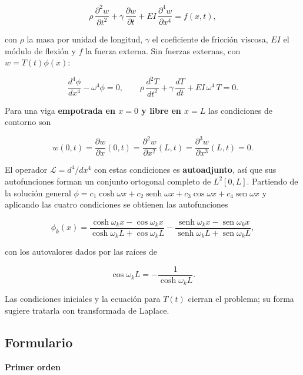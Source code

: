 \documentclass[
  spanish,
  a4paper,
]{scrbook}
\theoremstyle{definition}
\theoremstyle{plain}
\theoremstyle{definition}
\theoremstyle{plain}
\theoremstyle{definition}
\theoremstyle{remark}
\begin{document}
\[
\rho\,\frac{\partial^2 w}{\partial t^2} + \gamma\,\frac{\partial w}{\partial t}
+ EI\,\frac{\partial^4 w}{\partial x^4} = f(x,t) ,
\]

con \(\rho\) la masa por unidad de longitud, \(\gamma\) el coeficiente
de fricción viscosa, \(EI\) el módulo de flexión y \(f\) la fuerza
externa. Sin fuerzas externas, con \(w = T(t)\phi(x)\):

\[
\frac{d^4\phi}{dx^4} - \omega^4\phi = 0, \qquad
\rho\,\frac{d^2T}{dt^2} + \gamma\,\frac{dT}{dt} + EI\,\omega^4\,T = 0 .
\]

Para una viga \textbf{empotrada en \(x=0\) y libre en \(x=L\)} las
condiciones de contorno son

\[
w(0,t) = \frac{\partial w}{\partial x}(0,t) = \frac{\partial^2 w}{\partial x^2}(L,t)
= \frac{\partial^3 w}{\partial x^3}(L,t) = 0 .
\]

El operador \(\mathcal{L} = d^4/dx^4\) con estas condiciones es
\textbf{autoadjunto}, así que sus autofunciones forman un conjunto
ortogonal completo de \(L^2[0,L]\). Partiendo de la solución general
\(\phi = c_1\cosh\omega x + c_2\operatorname{senh}\omega x + c_3\cos\omega x + c_4\operatorname{sen}\omega x\)
y aplicando las cuatro condiciones se obtienen las autofunciones

\[
\phi_k(x) = \frac{\cosh\omega_kx - \cos\omega_kx}{\cosh\omega_kL + \cos\omega_kL}
- \frac{\operatorname{senh}\omega_kx - \operatorname{sen}\omega_kx}{\operatorname{senh}\omega_kL + \operatorname{sen}\omega_kL} ,
\]

con los autovalores dados por las raíces de

\[
\cos\omega_kL = -\frac{1}{\cosh\omega_kL} .
\]

Las condiciones iniciales y la ecuación para \(T(t)\) cierran el
problema; su forma sugiere tratarla con transformada de Laplace.

\subsection{Formulario}\label{sec-resumen-10}

\textbf{Primer orden}
\end{document}

